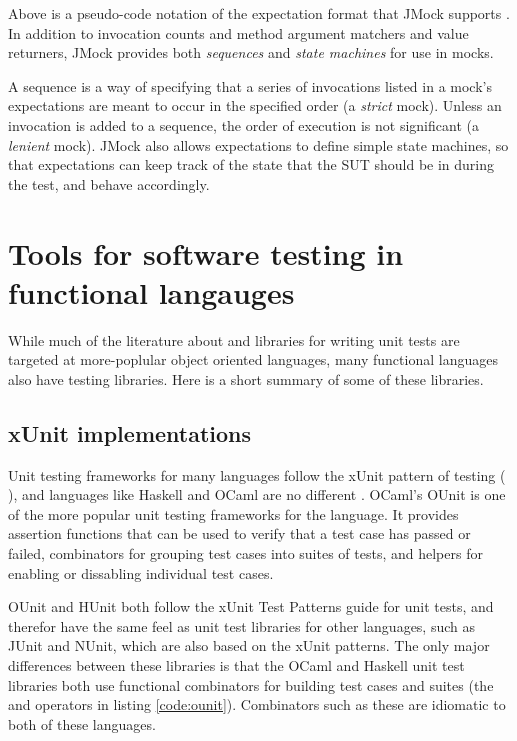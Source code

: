 Above is a pseudo-code notation of the expectation format that JMock
supports \cite{freeman:growing}. In addition to invocation counts and
method argument matchers and value returners, JMock provides both
\textit{sequences} and \textit{state machines} for use in mocks.

A sequence is a way of specifying that a series of invocations listed
in a mock's expectations are meant to occur in the specified order (a
\textit{strict} mock). Unless an invocation is added to a sequence,
the order of execution is not significant (a \textit{lenient}
mock). JMock also allows expectations to define simple state machines,
so that expectations can keep track of the state that the SUT should
be in during the test, and behave accordingly.

\section{Tools for software testing in functional langauges}
\label{testtools}

While much of the literature about and libraries for writing unit
tests are targeted at more-poplular object oriented languages,
many functional languages also have testing libraries. Here is a short
summary of some of these libraries.

\subsection{xUnit implementations}

Unit testing frameworks for many languages follow the xUnit pattern of
testing (\cite{www:junit} \cite{www:nunit} \cite{www:ruby:unit}), and
languages like Haskell and OCaml are no different \cite{www:hunit}
\cite{www:ounit}. OCaml's OUnit is one of the more popular unit
testing frameworks for the language. It provides assertion functions
that can be used to verify that a test case has passed or failed,
combinators for grouping test cases into suites of tests, and helpers
for enabling or dissabling individual test cases.



OUnit and HUnit both follow the xUnit Test Patterns guide for unit
tests, and therefor have the same feel as unit test libraries for
other languages, such as JUnit and NUnit, which are also based on the
xUnit patterns. The only major differences between these libraries is
that the OCaml and Haskell unit test libraries both use functional
combinators for building test cases and suites (the \code{>::} and
\code{>:::} operators in listing \ref{code:ounit}). Combinators such
as these are idiomatic to both of these languages.

